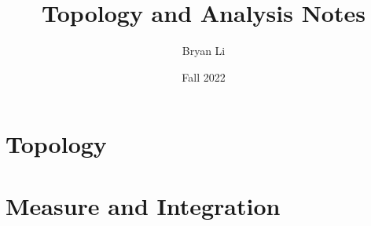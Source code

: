 \documentclass{../mimosis}
\title{Topology and Analysis Notes}
\author{Bryan Li}
\date{Fall 2022}
\begin{document}
    \frontmatter
    \maketitle
    \tableofcontents

    \mainmatter
    \part{Topology}
    
    
    
    
    \part{Measure and Integration}
    
\end{document}
